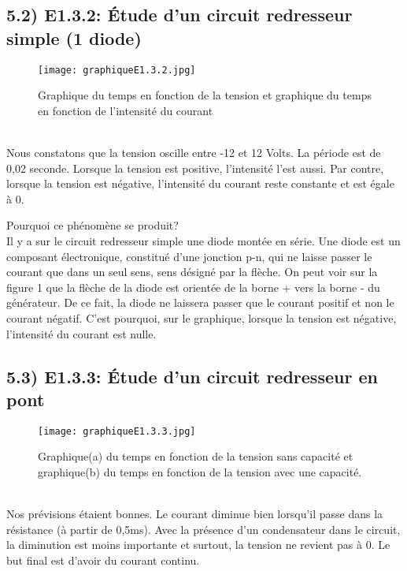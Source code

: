 \documentclass{report}
\begin{document}
\subsection*{5.2) E1.3.2: \'Etude d'un circuit redresseur simple (1 diode)}
\hspace*{0.5cm}
\begin{figure}[ht!]
\centering
\texttt{[image: graphiqueE1.3.2.jpg]}
\caption{Graphique du temps en fonction de la tension et graphique du temps en fonction de l'intensit\'e du courant}
\label{overflow}
\end{figure}
\\

Nous constatons que la tension oscille entre -12 et 12 Volts. La p\'eriode est de 0,02 seconde. Lorsque la tension est positive, l'intensit\'e l'est aussi. Par contre, lorsque la tension est n\'egative, l'intensit\'e du courant reste constante et est \'egale \`a 0.

Pourquoi ce ph\'enom\`ene se produit?
\\

Il y a sur le circuit redresseur simple une diode mont\'ee en s\'erie. Une diode est un composant \'electronique, constitu\'e d'une jonction p-n, qui ne laisse passer le courant que dans un seul sens, sens d\'esign\'e par la fl\`eche. On peut voir sur la figure 1 que la fl\`eche de la diode est orient\'ee de la borne + vers la borne - du g\'en\'erateur. De ce fait, la diode ne laissera passer que le courant positif et non le courant n\'egatif. C'est pourquoi, sur le graphique, lorsque la tension est n\'egative, l'intensit\'e du courant est nulle.

\subsection*{5.3) E1.3.3: \'Etude d'un circuit redresseur en pont}
\hspace*{0.5cm}
\begin{figure}[ht!]
\centering
\texttt{[image: graphiqueE1.3.3.jpg]}
\caption{Graphique(a) du temps en fonction de la tension sans capacit\'e et graphique(b) du temps en fonction de la tension avec une capacit\'e.}
\label{overflow}
\end{figure}
\\

Nos pr\'evisions \'etaient bonnes. Le courant diminue bien lorsqu'il passe dans la r\'esistance (\`a partir de 0,5ms). Avec la pr\'esence d'un condensateur dans le circuit, la diminution est moins importante et surtout, la tension ne revient pas \`a 0.
Le but final est d'avoir du courant continu.
\end{document}
